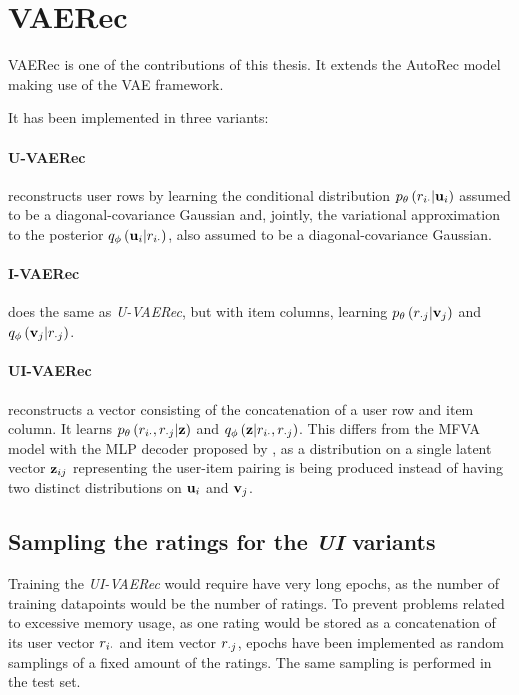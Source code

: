 \section{VAERec}

VAERec is one of the contributions of this thesis.
It extends the AutoRec model making use of the VAE framework.

It has been implemented in three variants:

\paragraph{U-VAERec} 
reconstructs user rows by learning the conditional distribution
$p_\theta\left(r_{i\cdot}|\mathbf{u}_i\right)$ assumed to be a diagonal-covariance Gaussian
and, jointly, the variational approximation to the posterior
$q_\phi\left(\mathbf{u}_i|r_{i\cdot}\right)$, also assumed to be a diagonal-covariance Gaussian.

\paragraph{I-VAERec} does the same as \emph{U-VAERec}, 
but with item columns, learning $p_\theta\left(r_{\cdot j}|\mathbf{v}_j\right)$
and $q_\phi\left(\mathbf{v}_j|r_{\cdot j}\right)$.

\paragraph{UI-VAERec} reconstructs a vector consisting of the concatenation
of a user row and item column.
It learns $p_\theta\left(r_{i\cdot},r_{\cdot j}|\mathbf{z}\right)$
and $q_\phi\left(\mathbf{z}|r_{i\cdot},r_{\cdot j}\right)$.
This differs from the MFVA model with 
the MLP decoder proposed by
\cite{vanBaalen2016}, as a distribution on a 
single latent vector $\mathbf{z}_{ij}$ representing
the user-item pairing is being produced instead 
of having two distinct distributions on
$\mathbf{u}_i$ and $\mathbf{v}_j$.

\subsection{Sampling the ratings for the \emph{UI} variants}

Training the \emph{UI-VAERec} would require
have very long epochs, as the number of training
datapoints would be the number of ratings.
To prevent problems related to excessive memory usage,
as one rating would be stored as a concatenation of
its user vector $r_{i\cdot}$ and item vector $r_{\cdot j}$,
epochs have been implemented as random samplings 
of a fixed amount of the ratings.
The same sampling is performed in the test set.
